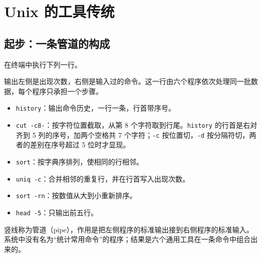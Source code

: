 \chapter{Unix 的工具传统}

\section{起步：一条管道的构成}

在终端中执行下列一行。


输出左侧是出现次数，右侧是输入过的命令。这一行由六个程序依次处理同一批数据，每个程序只承担一个步骤。

\begin{itemize}
  \item \texttt{history}：输出命令历史，一行一条，行首带序号。
  \item \texttt{cut -\allowbreak{}c8-}：按字符位置截取，从第 8 个字符取到行尾。\texttt{history} 的行首是右对齐到 5 列的序号，加两个空格共 7 个字符；\texttt{-c} 按位置切，\texttt{-d} 按分隔符切，两者的差别在序号超过 5 位时才显现。
  \item \texttt{sort}：按字典序排列，使相同的行相邻。
  \item \texttt{uniq -c}：合并相邻的重复行，并在行首写入出现次数。
  \item \texttt{sort -rn}：按数值从大到小重新排序。
  \item \texttt{head -5}：只输出前五行。
\end{itemize}

竖线称为管道（pipe），作用是把左侧程序的标准输出接到右侧程序的标准输入。系统中没有名为“统计常用命令”的程序；结果是六个通用工具在一条命令中组合出来的。

